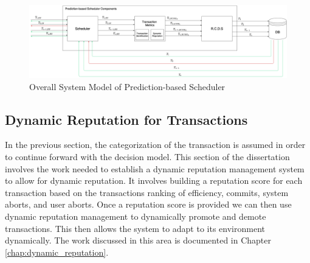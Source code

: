 \begin{figure}[h]
\captionsetup{justification=centering}
\centering
\includegraphics[width=\textwidth]{images/SystemModel_Overall}
\caption{Overall System Model of Prediction-based Scheduler}
\label{fig:system_model_overall}
\end{figure}

\subsection{Dynamic Reputation for Transactions}
In the previous section, the categorization of the transaction is assumed in order to continue forward with the decision model. This section of the dissertation involves the work needed to establish a dynamic reputation management system to allow for dynamic reputation. It involves building a reputation score for each transaction based on the transactions ranking of efficiency, commits, system aborts, and user aborts. Once a reputation score is provided we can then use dynamic reputation management to dynamically promote and demote transactions. This then allows the system to adapt to its environment dynamically. The work discussed in this area is documented in Chapter \ref{chap:dynamic_reputation}.

